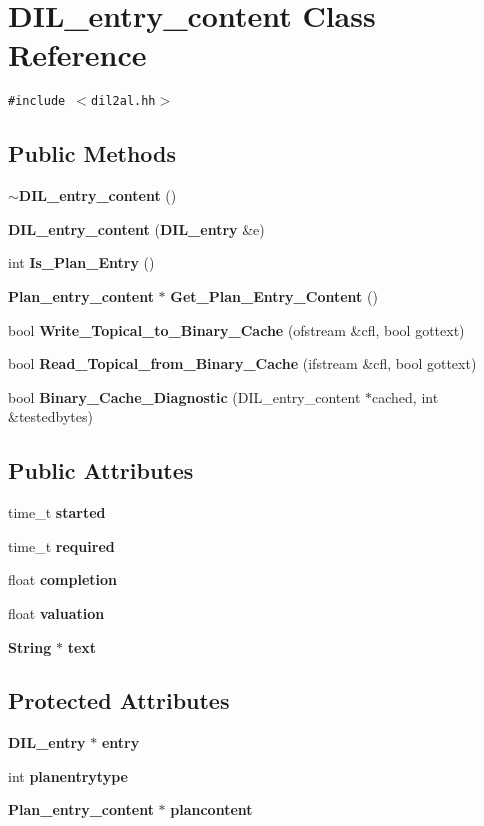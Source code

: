 \section{DIL\_\-entry\_\-content  Class Reference}
\label{classDIL__entry__content}
{\tt \#include $<$dil2al.hh$>$}

\subsection*{Public Methods}
\begin{CompactItemize}
\item 
{\bf $\sim$DIL\_\-entry\_\-content} ()
\item 
{\bf DIL\_\-entry\_\-content} ({\bf DIL\_\-entry} \&e)
\item 
int {\bf Is\_\-Plan\_\-Entry} ()
\item 
{\bf Plan\_\-entry\_\-content} $\ast$ {\bf Get\_\-Plan\_\-Entry\_\-Content} ()
\item 
bool {\bf Write\_\-Topical\_\-to\_\-Binary\_\-Cache} (ofstream \&cfl, bool gottext)
\item 
bool {\bf Read\_\-Topical\_\-from\_\-Binary\_\-Cache} (ifstream \&cfl, bool gottext)
\item 
bool {\bf Binary\_\-Cache\_\-Diagnostic} (DIL\_\-entry\_\-content $\ast$cached, int \&testedbytes)
\end{CompactItemize}
\subsection*{Public Attributes}
\begin{CompactItemize}
\item 
time\_\-t {\bf started}
\item 
time\_\-t {\bf required}
\item 
float {\bf completion}
\item 
float {\bf valuation}
\item 
{\bf String} $\ast$ {\bf text}
\end{CompactItemize}
\subsection*{Protected Attributes}
\begin{CompactItemize}
\item 
{\bf DIL\_\-entry} $\ast$ {\bf entry}
\item 
int {\bf planentrytype}
\item 
{\bf Plan\_\-entry\_\-content} $\ast$ {\bf plancontent}
\end{CompactItemize}


